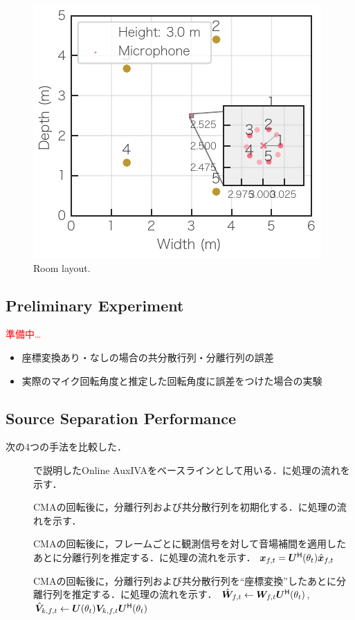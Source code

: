 \documentclass[sip,biber]{now-journal}
\newcommand{\todo}[1]{\textcolor{red}{#1}}
\begin{document}
\begin{figure}[t]
  \centering
  \includegraphics{figures/room_layout.pdf}
  \caption{Room layout.}%
  \label{fig:layout}
\end{figure}

\subsection{Preliminary Experiment}
\todo{準備中…}
\begin{itemize}
  \color{red}
  \item 座標変換あり・なしの場合の共分散行列・分離行列の誤差
  \item 実際のマイク回転角度と推定した回転角度に誤差をつけた場合の実験
\end{itemize}

\subsection{Source Separation Performance}

次の4つの手法を比較した．
\begin{description}
  \item[\NaiveIVA] で説明したOnline AuxIVAをベースラインとして用いる．に処理の流れを示す．
  \item[\ResetIVA] CMAの回転後に，分離行列および共分散行列を初期化する．に処理の流れを示す．
  \item[\RTObs] CMAの回転後に，フレームごとに観測信号を対して音場補間を適用したあとに分離行列を推定する．に処理の流れを示す．
    $\Obs _{\ft} = \rotMat ^{\hermite} (\rotSpat _{\tframe}) \rot{\Obs} _{\ft}$
  \item[\RTCov] CMAの回転後に，分離行列および共分散行列を``座標変換''したあとに分離行列を推定する．に処理の流れを示す．
    $\rot{\Demix} _{\ft} \gets \Demix _{\ft} \rotMat ^{\hermite} (\rotSpat _{\tframe})$,\; $\rot{\cov} _{\src,\ft} \gets \rotMat (\rotSpat _{\tframe}) \cov _{\src,\ft} \rotMat ^{\hermite} (\rotSpat _{\tframe})$
\end{description}
\end{document}

